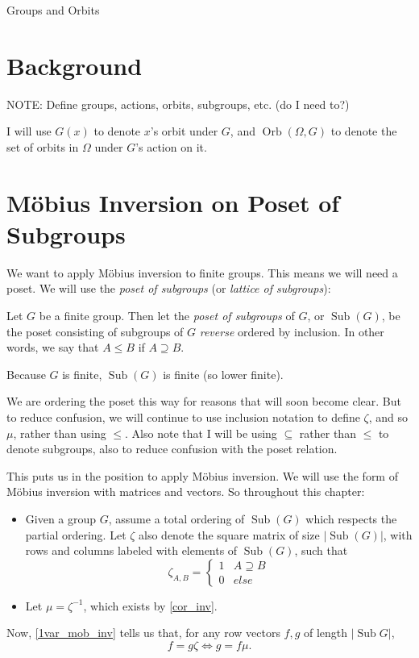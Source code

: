 \documentclass[12pt]{pom_thesis}
\DeclareMathOperator{\sub}{Sub}
\DeclareMathOperator{\orb}{Orb}
\begin{document}
\begin{chapter}{Groups and Orbits} 
\section{Background}
NOTE: Define groups, actions, orbits, subgroups, etc. (do I need to?)

I will use $G(x)$ to denote $x$'s orbit under $G$, and $\orb(\Omega, G)$ to denote the set of orbits in $\Omega$ under $G$'s action on it. 
\section{M\"obius Inversion on Poset of Subgroups}
We want to apply M\"obius inversion to finite groups. This means we will need a poset. We will use the \emph{poset of subgroups} (or \emph{lattice of subgroups}):
\begin{defn}
Let $G$ be a finite group. Then let the \textit{poset of subgroups} of $G$, or $\sub(G)$, be the poset consisting of subgroups of $G$ \emph{reverse} ordered by inclusion. In other words, we say that $A \leq B$ if $A \supseteq B$.
\end{defn}
\begin{rmk}
Because $G$ is finite, $\sub(G)$ is finite (so lower finite).
\end{rmk}
\begin{rmk}
We are ordering the poset this way for reasons that will soon become clear. But to reduce confusion, we will continue to use inclusion notation to define $\zeta$, and so $\mu$, rather than using $\leq$. Also note that I will be using $\subseteq$ rather than $\leq$ to denote subgroups, also to reduce confusion with the poset relation.
\end{rmk}
This puts us in the position to apply M\"obius inversion. We will use the form of M\"obius inversion with matrices and vectors. So throughout this chapter:
\begin{itemize}
\item Given a group $G$, assume a total ordering of $\sub(G)$ which respects the partial ordering. Let $\zeta$ also denote the square matrix of size $|\sub(G)|$, with rows and columns labeled with elements of $\sub(G)$, such that 
\[
\zeta_{A,B} = \begin{cases}
1 & A \supseteq B\\
0 & else
\end{cases}
\]
\item Let $\mu = \zeta^{-1}$, which exists by \ref{cor_inv}.
\end{itemize}
Now, \ref{1var_mob_inv} tells us that, for any row vectors $f,g$ of length $|\sub{G}|$, 
\[
f = g\zeta \iff g = f\mu.
\]

\end{chapter}
\end{document}
